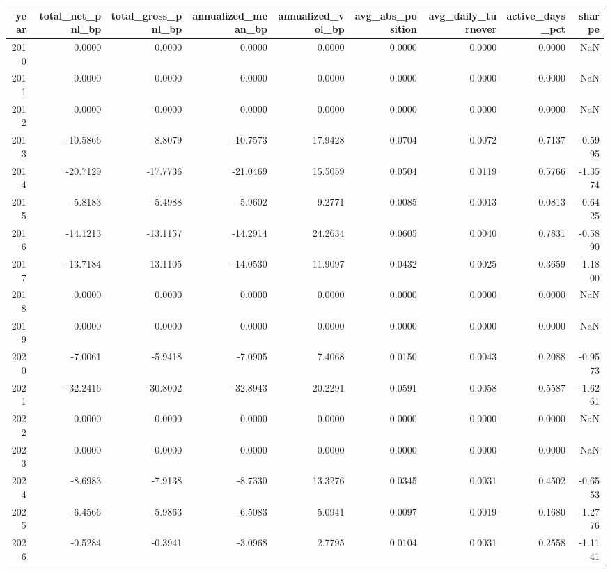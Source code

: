 \begin{tabular}{rrrrrrrrr}
\toprule
year & total_net_pnl_bp & total_gross_pnl_bp & annualized_mean_bp & annualized_vol_bp & avg_abs_position & avg_daily_turnover & active_days_pct & sharpe \\
\midrule
2010 & 0.0000 & 0.0000 & 0.0000 & 0.0000 & 0.0000 & 0.0000 & 0.0000 & NaN \\
2011 & 0.0000 & 0.0000 & 0.0000 & 0.0000 & 0.0000 & 0.0000 & 0.0000 & NaN \\
2012 & 0.0000 & 0.0000 & 0.0000 & 0.0000 & 0.0000 & 0.0000 & 0.0000 & NaN \\
2013 & -10.5866 & -8.8079 & -10.7573 & 17.9428 & 0.0704 & 0.0072 & 0.7137 & -0.5995 \\
2014 & -20.7129 & -17.7736 & -21.0469 & 15.5059 & 0.0504 & 0.0119 & 0.5766 & -1.3574 \\
2015 & -5.8183 & -5.4988 & -5.9602 & 9.2771 & 0.0085 & 0.0013 & 0.0813 & -0.6425 \\
2016 & -14.1213 & -13.1157 & -14.2914 & 24.2634 & 0.0605 & 0.0040 & 0.7831 & -0.5890 \\
2017 & -13.7184 & -13.1105 & -14.0530 & 11.9097 & 0.0432 & 0.0025 & 0.3659 & -1.1800 \\
2018 & 0.0000 & 0.0000 & 0.0000 & 0.0000 & 0.0000 & 0.0000 & 0.0000 & NaN \\
2019 & 0.0000 & 0.0000 & 0.0000 & 0.0000 & 0.0000 & 0.0000 & 0.0000 & NaN \\
2020 & -7.0061 & -5.9418 & -7.0905 & 7.4068 & 0.0150 & 0.0043 & 0.2088 & -0.9573 \\
2021 & -32.2416 & -30.8002 & -32.8943 & 20.2291 & 0.0591 & 0.0058 & 0.5587 & -1.6261 \\
2022 & 0.0000 & 0.0000 & 0.0000 & 0.0000 & 0.0000 & 0.0000 & 0.0000 & NaN \\
2023 & 0.0000 & 0.0000 & 0.0000 & 0.0000 & 0.0000 & 0.0000 & 0.0000 & NaN \\
2024 & -8.6983 & -7.9138 & -8.7330 & 13.3276 & 0.0345 & 0.0031 & 0.4502 & -0.6553 \\
2025 & -6.4566 & -5.9863 & -6.5083 & 5.0941 & 0.0097 & 0.0019 & 0.1680 & -1.2776 \\
2026 & -0.5284 & -0.3941 & -3.0968 & 2.7795 & 0.0104 & 0.0031 & 0.2558 & -1.1141 \\
\bottomrule
\end{tabular}
